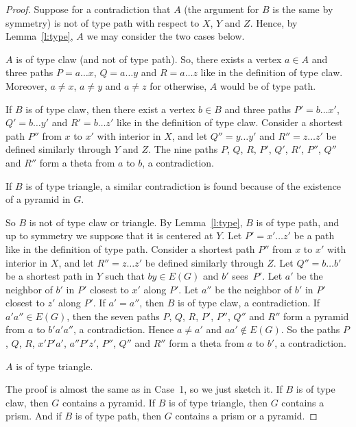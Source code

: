 \documentclass[10pt,a4paper]{amsart}
\begin{document}
\begin{proof}
  Suppose for a contradiction that $A$ (the argument for $B$ is the same by symmetry) is not of type path with
  respect to $X$, $Y$ and $Z$.  Hence, by Lemma~\ref{l:type}, $A$ we
  may consider the two cases below.

   $A$ is of type claw (and not of type path).  So, there
  exists a vertex $a\in A$ and three paths $P = a\dots x$,
  $Q = a\dots y$ and $R= a\dots z$ like in the definition of type
  claw.  Moreover, $a\neq x$, $a\neq y$ and $a\neq z$ for otherwise,
  $A$ would be of type path.

  If $B$ is of type claw, then there exist a vertex $b\in B$ and
  three paths $P' = b\dots x'$, $Q' = b\dots y'$ and $R'= b\dots z'$
  like in the definition of type claw. Consider a shortest path $P''$
  from $x$ to $x'$ with interior in $X$, and let $Q'' = y\dots y'$ and
  $R'' = z \dots z'$ be defined similarly through $Y$ and $Z$.  The
  nine paths $P$, $Q$, $R$, $P'$, $Q'$, $R'$, $P''$, $Q''$ and $R''$
  form a theta from $a$ to $b$, a contradiction.

  If $B$ is of type triangle, a similar contradiction is found because
  of the existence of a pyramid in $G$. 

  So $B$ is not of type claw or triangle.  By Lemma~\ref{l:type}, $B$
  is of type path, and up to symmetry we suppose that it is centered
  at $Y$.  Let $P' = x' \dots z'$ be a path like in the definition of
  type path. Consider a shortest path $P''$ from $x$ to $x'$ with
  interior in $X$, and let $R'' = z \dots z'$ be defined similarly
  through $Z$.  Let $Q''=b\dots b'$ be a shortest path in $Y$ such
  that $by\in E(G)$ and $b'$ sees~$P'$.  Let $a'$ be the neighbor of
  $b'$ in $P'$ closest to $x'$ along $P'$. Let $a''$ be the neighbor
  of $b'$ in $P'$ closest to $z'$ along $P'$.  If $a'=a''$, then $B$
  is of type claw, a contradiction.  If $a'a''\in E(G)$, then the
  seven paths $P$, $Q$, $R$, $P'$, $P''$, $Q''$ and $R''$ form a
  pyramid from $a$ to $b'a'a''$, a contradiction.  Hence $a\neq a'$
  and $aa'\notin E(G)$.  So the paths $P$, $Q$, $R$, $x'P'a'$,
  $a''P'z'$, $P''$, $Q''$ and $R''$ form a theta from $a$ to $b'$, a
  contradiction.


   $A$ is of type triangle.

  The proof is almost the same as in Case~1, so we just sketch it.  If
  $B$ is of type claw, then $G$ contains a pyramid. If $B$ is of type
  triangle, then $G$ contains a prism. And if $B$ is of type path,
  then $G$ contains a prism or a pyramid.   
\end{proof}
\end{document}
